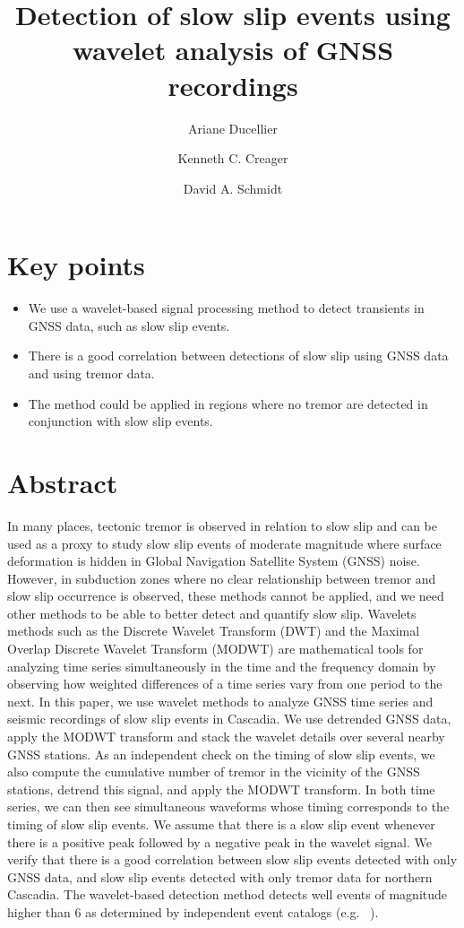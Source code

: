 \documentclass{article}
\title{Detection of slow slip events using wavelet analysis of GNSS recordings}
\author[1]{Ariane Ducellier}
\author[2]{Kenneth C. Creager}
\author[2]{David A. Schmidt}
\affil[1]{Corresponding author. University of Washington, Department of Earth and Space Sciences, Box 351310, 4000 15th Avenue NE Seattle, WA 98195-1310}
\affil[2]{University of Washington, Department of Earth and Space Sciences}
\date{}
\begin{document}
\maketitle

\section*{Key points}

\begin{itemize}
\item We use a wavelet-based signal processing method to detect transients in GNSS data, such as slow slip events.
\item There is a good correlation between detections of slow slip using GNSS data and using tremor data.
\item The method could be applied in regions where no tremor are detected in conjunction with slow slip events.
\end{itemize}

\newpage

\doublespacing

\section*{Abstract}

In many places, tectonic tremor is observed in relation to slow slip and can be used as a proxy to study slow slip events of moderate magnitude where surface deformation is hidden in Global Navigation Satellite System (GNSS) noise. However, in subduction zones where no clear relationship between tremor and slow slip occurrence is observed, these methods cannot be applied, and we need other methods to be able to better detect and quantify slow slip. Wavelets methods such as the Discrete Wavelet Transform (DWT) and the Maximal Overlap Discrete Wavelet Transform (MODWT) are mathematical tools for analyzing time series simultaneously in the time and the frequency domain by observing how weighted differences of a time series vary from one period to the next. In this paper, we use wavelet methods to analyze GNSS time series and seismic recordings of slow slip events in Cascadia. We use detrended GNSS data, apply the MODWT transform and stack the wavelet details over several nearby GNSS stations. As an independent check on the timing of slow slip events, we also compute the cumulative number of tremor in the vicinity of the GNSS stations, detrend this signal, and apply the MODWT transform. In both time series, we can then see simultaneous waveforms whose timing corresponds to the timing of slow slip events. We assume that there is a slow slip event whenever there is a positive peak followed by a negative peak in the wavelet signal. We verify that there is a good correlation between slow slip events detected with only GNSS data, and slow slip events detected with only tremor data for northern Cascadia. The wavelet-based detection method detects well events of magnitude higher than 6 as determined by independent event catalogs (e.g. ~\citep{MIC_2019}).
\end{document}
